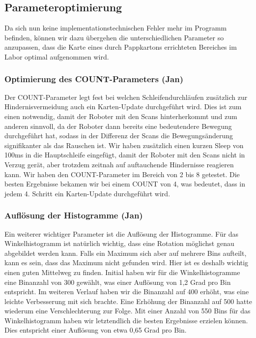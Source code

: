 \subsection{Parameteroptimierung}

Da sich nun keine implementationstechnischen Fehler mehr im Programm befinden, können wir dazu übergehen die unterschiedlichen Parameter so anzupassen, dass die Karte eines durch Pappkartons errichteten Bereiches im Labor optimal aufgenommen wird.

\subsubsection{Optimierung des COUNT-Parameters (Jan)}

Der COUNT-Parameter legt fest bei welchen Schleifendurchläufen zusätzlich zur Hindernisvermeidung auch ein Karten-Update durchgeführt wird. Dies ist zum einen notwendig, damit der Roboter mit den Scans hinterherkommt und zum anderen sinnvoll, da der Roboter dann bereits eine bedeutendere Bewegung durchgeführt hat, sodass in der Differenz der Scans die Bewegungsänderung signifikanter als das Rauschen ist. Wir haben zusätzlich einen kurzen Sleep von 100ms in die Hauptschleife eingefügt, damit der Roboter mit den Scans nicht in Verzug gerät, aber trotzdem zeitnah auf auftauchende Hindernisse reagieren kann.
Wir haben den COUNT-Parameter im Bereich von 2 bis 8 getestet. Die besten Ergebnisse bekamen wir bei einem COUNT von 4, was bedeutet, dass in jedem 4. Schritt ein Karten-Update durchgeführt wird.




\subsubsection{Auflösung der Histogramme (Jan)}

Ein weiterer wichtiger Parameter ist die Auflösung der Histogramme.
Für das Winkelhistogramm ist natürlich wichtig, dass eine Rotation möglichst genau abgebildet werden kann. Falls ein Maximum sich aber auf mehrere Bins aufteilt, kann es sein, dass das Maximum nicht gefunden wird. Hier ist es deshalb wichtig einen guten Mittelweg zu finden. Initial haben wir für die Winkelhistogramme eine Binanzahl von 300 gewählt, was einer Auflösung von 1,2 Grad pro Bin entspricht. Im weiteren Verlauf haben wir die Binanzahl auf 400 erhöht, was eine leichte Verbesserung mit sich brachte. Eine Erhöhung der Binanzahl auf 500 hatte wiederum eine Verschlechterung zur Folge. Mit einer Anzahl von 550 Bins für das Winkelhistogramm haben wir letztendlich die besten Ergebnisse erzielen können. Dies entspricht einer Auflösung von etwa 0,65 Grad pro Bin.

